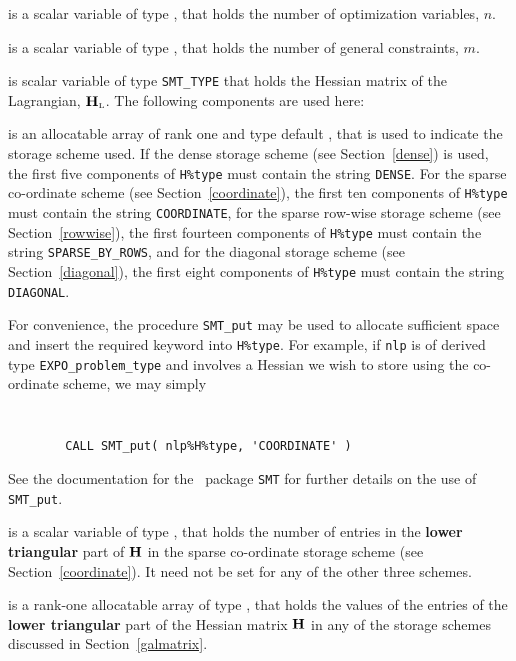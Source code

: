 \documentclass{galahad}
\newcommand{\packagename}{EXPO}
\newcommand{\bmHL}{\bmH\sub{L}}
\begin{document}
\begin{description}

 is a scalar variable of type \integer,
 that holds the number of optimization variables, $n$.

 is a scalar variable of type \integer,
 that holds the number of general constraints, $m$.

 is scalar variable of type {\tt SMT\_TYPE}
that holds the Hessian matrix of the Lagrangian, $\bmHL$. 
The following components are used here:

\begin{description}

 is an allocatable array of rank one and type default
\character, that
is used to indicate the storage scheme used. If the dense storage scheme
(see Section~\ref{dense}) is used,
the first five components of {\tt H\%type} must contain the
string {\tt DENSE}.
For the sparse co-ordinate scheme (see Section~\ref{coordinate}),
the first ten components of {\tt H\%type} must contain the
string {\tt COORDINATE},
for the sparse row-wise storage scheme (see Section~\ref{rowwise}),
the first fourteen components of {\tt H\%type} must contain the
string {\tt SPARSE\_BY\_ROWS},
and for the diagonal storage scheme (see Section~\ref{diagonal}),
the first eight components of {\tt H\%type} must contain the
string {\tt DIAGONAL}.

For convenience, the procedure {\tt SMT\_put}
may be used to allocate sufficient space and insert the required keyword
into {\tt H\%type}.
For example, if {\tt nlp} is of derived type {\tt \packagename\_problem\_type}
and involves a Hessian we wish to store using the co-ordinate scheme,
we may simply
{\tt
\begin{verbatim}
        CALL SMT_put( nlp%H%type, 'COORDINATE' )
\end{verbatim}
}
\noindent
See the documentation for the \galahad\ package {\tt SMT}
for further details on the use of {\tt SMT\_put}.

 is a scalar variable of type \integer, that
holds the number of entries in the {\bf lower triangular} part of ${\mathbf{H}}$
in the sparse co-ordinate storage scheme (see Section~\ref{coordinate}).
It need not be set for any of the other three schemes.

 is a rank-one allocatable array of type \realdp, that holds
the values of the entries of the {\bf lower triangular} part
of the Hessian matrix ${\mathbf{H}}$ in any of the
storage schemes discussed in Section~\ref{galmatrix}.


\end{description}
\end{description}
\end{document}
